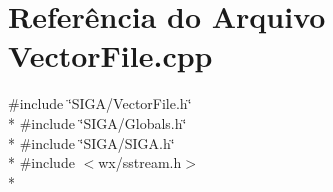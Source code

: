 \section{Referência do Arquivo Vector\+File.\+cpp}
\label{_vector_file_8cpp}
{\ttfamily \#include \char`\"{}S\+I\+G\+A/\+Vector\+File.\+h\char`\"{}}\\*
{\ttfamily \#include \char`\"{}S\+I\+G\+A/\+Globals.\+h\char`\"{}}\\*
{\ttfamily \#include \char`\"{}S\+I\+G\+A/\+S\+I\+G\+A.\+h\char`\"{}}\\*
{\ttfamily \#include $<$wx/sstream.\+h$>$}\\*
